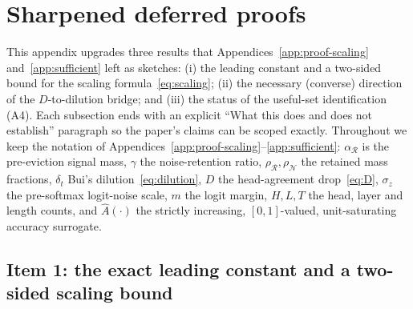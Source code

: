 %
%

\newtheorem{theorem}{Theorem}
\newtheorem{proposition}{Proposition}
\newtheorem{corollary}{Corollary}
\theoremstyle{definition}
\newtheorem{assumption}{Assumption}
\theoremstyle{remark}
\newtheorem{remark}{Remark}

\section{Sharpened deferred proofs}
\label{app:sharpened}

This appendix upgrades three results that Appendices~\ref{app:proof-scaling}
and~\ref{app:sufficient} left as sketches: (i) the leading constant and a
two-sided bound for the scaling formula~\eqref{eq:scaling}; (ii) the
necessary (converse) direction of the $D$-to-dilution bridge; and (iii) the
status of the useful-set identification (A4). Each subsection ends with an
explicit ``What this does and does not establish'' paragraph so the paper's
claims can be scoped exactly. Throughout we keep the notation of
Appendices~\ref{app:proof-scaling}--\ref{app:sufficient}: $\alpha_{\mathcal{R}}$
is the pre-eviction signal mass, $\gamma$ the noise-retention ratio,
$\rho_{\mathcal{R}},\rho_{\mathcal{N}}$ the retained mass fractions, $\delta_t$
Bui's dilution~\eqref{eq:dilution}, $D$ the head-agreement drop~\eqref{eq:D},
$\sigma_z$ the pre-softmax logit-noise scale, $m$ the logit margin, $H,L,T$ the
head, layer and length counts, and $\hat A(\cdot)$ the strictly increasing,
$[0,1]$-valued, unit-saturating accuracy surrogate.

\subsection{Item 1: the exact leading constant and a two-sided scaling bound}
\label{app:tight-scaling}

